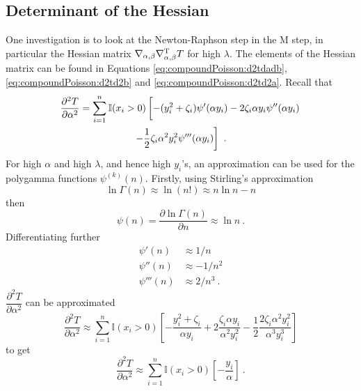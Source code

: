 \subsection{Determinant of the Hessian}

One investigation is to look at the Newton-Raphson step in the M step, in particular the Hessian matrix $\nabla_{\alpha,\beta}\nabla_{\alpha,\beta}^\textup{T} T$ for high $\lambda$. The elements of the Hessian matrix can be found in Equations \eqref{eq:compoundPoisson:d2tdadb}, \eqref{eq:compoundPoisson:d2td2b} and \eqref{eq:compoundPoisson:d2td2a}. Recall that
\begin{multline*}
  \frac{\partial^2 T}{\partial \alpha^2} = 
  \sum_{i=1}^n\mathbb{I}(x_i>0)\left[
    -(y_i^2+\zeta_i)\psi'(\alpha y_i) - 2\zeta_i\alpha y_i\psi''(\alpha y_i)
    \vphantom{\frac{1}{2}}
  \right.
  \\
  \left.  
    -\frac{1}{2}\zeta_i\alpha^2y_i^2\psi'''(\alpha y_i)
  \right]
  \ .
\end{multline*}
For high $\alpha$ and high $\lambda$, and hence high $y_i$'s, an approximation can be used for the polygamma functions $\psi^{(k)}(n)$. Firstly, using Stirling's approximation
\begin{equation}
  \ln\Gamma(n)\approx\ln(n!)\approx n\ln n-n
\end{equation}
then
\begin{equation}
  \psi(n) = \frac{\partial\ln\Gamma(n)}{\partial n} \approx \ln n
  \ .
\end{equation}
Differentiating further
\begin{align}
  \psi'(n) &\approx 1/n \\
  \psi''(n) & \approx -1/n^2 \\
  \psi'''(n) & \approx 2/n^3
  \ .
\end{align}
$\dfrac{\partial^2T}{\partial\alpha^2}$ can be approximated
\begin{equation*}
  \frac{\partial^2 T}{\partial \alpha^2} \approx 
  \sum_{i=1}^n\mathbb{I}(x_i>0)
  \left[
    -\frac{y_i^2+\zeta_i}{\alpha y_i} + 2\frac{\zeta_i\alpha y_i}{\alpha^2 y_i^2}
    -\frac{1}{2}\frac{2\zeta_i\alpha^2y_i^2}{\alpha^3 y_i^3}
  \right]
\end{equation*}
to get
\begin{equation}
  \frac{\partial^2 T}{\partial \alpha^2} \approx 
  \sum_{i=1}^n\mathbb{I}(x_i>0)
  \left[
    -\frac{y_i}{\alpha}
  \right]
  \ .
\end{equation}

